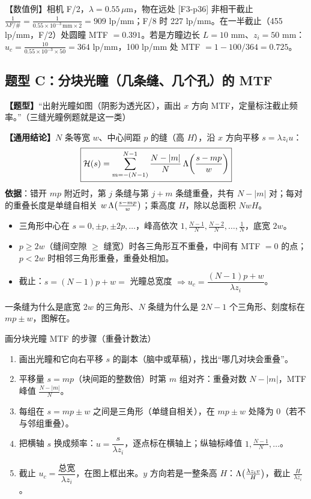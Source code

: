 \begin{exam}{【数值例】相机 F/2，$\lambda=0.55\,\mu$m，物在远处 [F3-p36]}
非相干截止 $\frac{1}{\lambda F/\#}=\frac{1}{0.55\times10^{-3}\,\text{mm}\times2}=909$ lp/mm；F/8 时 227 lp/mm。在一半截止（455 lp/mm，F/2）处圆瞳 MTF $=0.391$。若是方瞳边长 $L=10$ mm、$z_i=50$ mm：$u_c=\frac{10}{0.55\times10^{-3}\times50}=364$ lp/mm，100 lp/mm 处 MTF $=1-100/364=0.725$。
\end{exam}

\subsection*{题型 C：分块光瞳（几条缝、几个孔）的 MTF}\label{sec:typeC}
\textbf{【题型】}“出射光瞳如图（阴影为透光区），画出 $x$ 方向 MTF，定量标注截止频率。”（三缝光瞳例题就是这一类）

\textbf{【通用结论】}$N$ 条等宽 $w$、中心间距 $p$ 的缝（高 $H$），沿 $x$ 方向平移 $s=\lambda z_iu$：
\[
\boxed{\mathcal H(s)=\sum_{m=-(N-1)}^{N-1}\frac{N-|m|}{N}\,\Lambda\!\left(\frac{s-mp}{w}\right)}
\]
\textbf{依据}：错开 $mp$ 附近时，第 $j$ 条缝与第 $j+m$ 条缝重叠，共有 $N-|m|$ 对；每对的重叠长度是单缝自相关 $w\,\Lambda\big(\frac{s-mp}{w}\big)$；乘高度 $H$，除以总面积 $NwH$。
\begin{itemize}
\item 三角形中心在 $s=0,\pm p,\pm2p,\dots$，峰高依次 $1,\frac{N-1}{N},\frac{N-2}{N},\dots,\frac1N$，底宽 $2w$。
\item $p\ge2w$（缝间空隙 $\ge$ 缝宽）时各三角形互不重叠，中间有 MTF $=0$ 的点；$p<2w$ 时相邻三角形重叠，重叠处相加。
\item 截止：$s=(N-1)p+w=$ 光瞳总宽度 $\Rightarrow u_c=\dfrac{(N-1)p+w}{\lambda z_i}$。
\end{itemize}

一条缝为什么是底宽 $2w$ 的三角形、$N$ 条缝为什么是 $2N-1$ 个三角形、刻度标在 $mp\pm w$，图解在\pageref{rcp:mtfoverlap}。

\begin{recipe}{画分块光瞳 MTF 的步骤（重叠计数法）}
\begin{enumerate}
\item 画出光瞳和它向右平移 $s$ 的副本（脑中或草稿），找出“哪几对块会重叠”。
\item 平移量 $s=mp$（块间距的整数倍）时第 $m$ 组对齐：重叠对数 $N-|m|$，MTF 峰值 $\frac{N-|m|}{N}$。
\item 每组在 $s=mp\pm w$ 之间是三角形（单缝自相关），在 $mp\pm w$ 处降为 0（若不与邻组重叠）。
\item 把横轴 $s$ 换成频率：$u=\dfrac{s}{\lambda z_i}$，逐点标在横轴上；纵轴标峰值 $1,\frac{N-1}N,\dots$。
\item 截止 $u_c=\dfrac{\text{总宽}}{\lambda z_i}$，在图上框出来。$y$ 方向若是一整条高 $H$：$\Lambda\big(\frac{\lambda z_iv}{H}\big)$，截止 $\frac{H}{\lambda z_i}$。
\end{enumerate}
\end{recipe}


